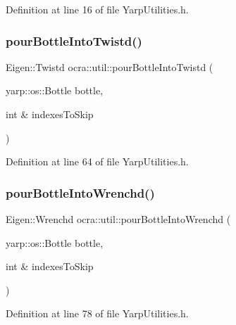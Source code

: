 Definition at line 16 of file Yarp\+Utilities.\+h.

\hypertarget{namespaceocra_1_1util_af97e92d4d6f71f03338183e6f5ea1188}{}\label{namespaceocra_1_1util_af97e92d4d6f71f03338183e6f5ea1188} 
\subsubsection{\texorpdfstring{pour\+Bottle\+Into\+Twistd()}{pourBottleIntoTwistd()}}
{\footnotesize\ttfamily Eigen\+::\+Twistd ocra\+::util\+::pour\+Bottle\+Into\+Twistd (\begin{DoxyParamCaption}\item[{yarp\+::os\+::\+Bottle}]{bottle,  }\item[{int \&}]{indexes\+To\+Skip }\end{DoxyParamCaption})\hspace{0.3cm}{\ttfamily [inline]}}



Definition at line 64 of file Yarp\+Utilities.\+h.

\hypertarget{namespaceocra_1_1util_a68e8e18301fe4f4167e8dee988df2d3c}{}\label{namespaceocra_1_1util_a68e8e18301fe4f4167e8dee988df2d3c} 
\subsubsection{\texorpdfstring{pour\+Bottle\+Into\+Wrenchd()}{pourBottleIntoWrenchd()}}
{\footnotesize\ttfamily Eigen\+::\+Wrenchd ocra\+::util\+::pour\+Bottle\+Into\+Wrenchd (\begin{DoxyParamCaption}\item[{yarp\+::os\+::\+Bottle}]{bottle,  }\item[{int \&}]{indexes\+To\+Skip }\end{DoxyParamCaption})\hspace{0.3cm}{\ttfamily [inline]}}



Definition at line 78 of file Yarp\+Utilities.\+h.

\hypertarget{namespaceocra_1_1util_aa823d67f5ccb816d579756460867720f}{}\label{namespaceocra_1_1util_aa823d67f5ccb816d579756460867720f} 
